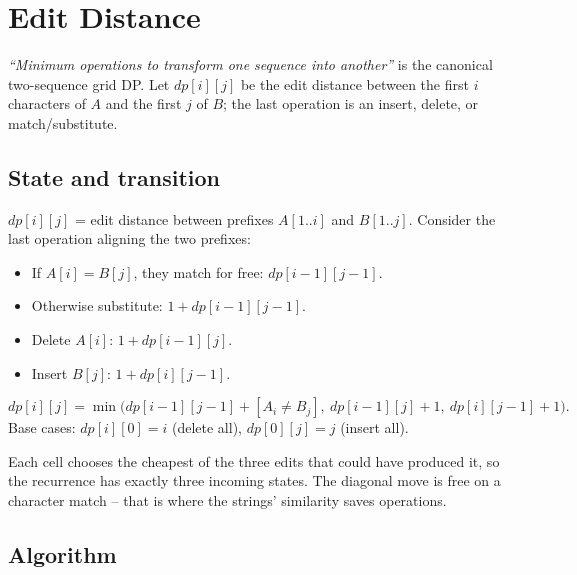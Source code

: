 \section{Edit Distance}
\label{sec:cses-edit-distance}


\begin{patternbox}
\emph{``Minimum operations to transform one sequence into another''} is
the canonical two-sequence grid DP. Let $\textit{dp}[i][j]$ be the edit
distance between the first $i$ characters of $A$ and the first $j$ of $B$;
the last operation is an insert, delete, or match/substitute.
\end{patternbox}

\subsection*{State and transition}

$\textit{dp}[i][j]$ = edit distance between prefixes $A[1..i]$ and
$B[1..j]$. Consider the last operation aligning the two prefixes:
\begin{itemize}
  \item If $A[i]=B[j]$, they match for free:
        $\textit{dp}[i-1][j-1]$.
  \item Otherwise substitute: $1+\textit{dp}[i-1][j-1]$.
  \item Delete $A[i]$: $1+\textit{dp}[i-1][j]$.
  \item Insert $B[j]$: $1+\textit{dp}[i][j-1]$.
\end{itemize}
\[
  \textit{dp}[i][j]=\min\!\big(\textit{dp}[i-1][j-1]+[A_i\ne B_j],\
  \textit{dp}[i-1][j]+1,\ \textit{dp}[i][j-1]+1\big).
\]
Base cases: $\textit{dp}[i][0]=i$ (delete all), $\textit{dp}[0][j]=j$
(insert all).

\begin{ideabox}
Each cell chooses the cheapest of the three edits that could have produced
it, so the recurrence has exactly three incoming states. The diagonal move
is free on a character match -- that is where the strings' similarity saves
operations.
\end{ideabox}

\subsection*{Algorithm}


